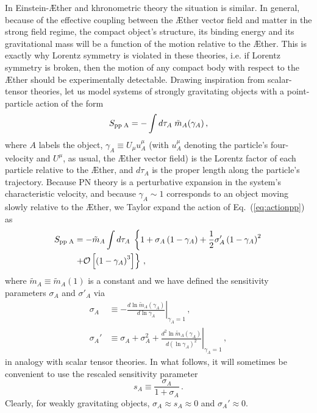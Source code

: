 \documentclass[prd,aps,twocolumn,nofootinbib,showpacs,superscriptaddress]{revtex4-1}
\newcommand\be{\begin{equation}}
\newcommand\ee{\end{equation}}
\def\m{\mu}
\newcommand{\nn}{\nonumber}
\begin{document}
In Einstein-\AE ther and khronometric theory the situation is similar. In general, because of the
effective coupling between the \AE ther vector field and matter in the strong field  regime, the compact object's 
structure, its binding energy and its gravitational mass will be a function of the motion relative to the 
\AE ther. This is exactly why Lorentz symmetry is violated in these theories, i.e. if Lorentz symmetry is broken, then 
the motion of any compact body with respect to the \AE ther should be experimentally detectable. 
Drawing inspiration from scalar-tensor theories, let us model systems of strongly gravitating 
objects with a point-particle action of the form~\cite{Foster:2007gr} 
%
\be 
\label{eq:actionpp}
S_{\rm pp \; A} = - \int d\tau_A \; \tilde{m}_{A}(\gamma_{A})\,, 
\ee
%
where $A$ labels the object, $\gamma_{A} \equiv U_{\m} u_{A}^{\m}$ (with $u_{A}^{\m}$ denoting the particle's four-velocity and $U^{\m}$, as usual, the \AE ther vector field) is the Lorentz factor of each 
particle relative to the \AE ther, and $d\tau_A$ is the proper length along the particle's trajectory.
Because PN theory is a perturbative expansion in the system's characteristic velocity,
and because $\gamma_{A} \sim 1$ corresponds to an object moving slowly relative to the \AE ther, 
we Taylor expand the action of Eq.~(\ref{eq:actionpp}) as
%
\begin{align}
\label{taylor-pp}
S_{\rm pp \; A} &=- \tilde{m}_{A}  \int d\tau_A \; 
\left\{1 + \sigma_{A} \left(1- \gamma_{A}\right) + \frac{1}{2} \sigma_{A}' \left(1 - \gamma_{A} \right)^{2}
\right.
\nn \\
&\left.
+ {\cal{O}}\left[\left(1-\gamma_{A}\right)^{3}\right] \right\}\,, 
\end{align}
%
where $\tilde{m}_{A}\equiv \tilde m_A(1)$ is a constant and we have defined the sensitivity parameters $\sigma_{A}$ and $\sigma'_{A}$ via
%
\begin{align}
\label{sigma-def}
\sigma_{A} &\equiv - \left.\frac{d \ln \tilde{m}_{A}(\gamma_A)}{d \ln \gamma_{A}}
\right|_{\gamma_{A} = 1}\,,\,
\\
\sigma_{A}' &\equiv \sigma_{A} + \sigma_{A}^{2} + \left.\frac{d^{2} \ln \tilde{m}_{A}(\gamma_A)}{d (\ln \gamma_{A})^{2}}\right|_{\gamma_{A} = 1}\,,
\end{align}
%
in analogy with scalar tensor theories. 
In what follows,
it will sometimes be convenient to use the   
rescaled sensitivity parameter
\be
\label{s-sigma-rel}
s_{A} \equiv \frac{\sigma_{A}}{1 + \sigma_{A}}\,.
\ee
Clearly, for weakly gravitating objects, $\sigma_{A}\approx s_A\approx 0$ and $\sigma_{A}'\approx 0$. 
\end{document}
